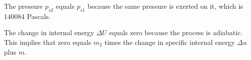 The pressure \( p_{s2} \) equals \( p_{s1} \) because the same pressure is exerted on it, which is \( 140084 \) Pascals.

The change in internal energy \( \Delta U \) equals zero because the process is adiabatic. This implies that zero equals \( m_2 \) times the change in specific internal energy \( \Delta u \) plus \( m \).